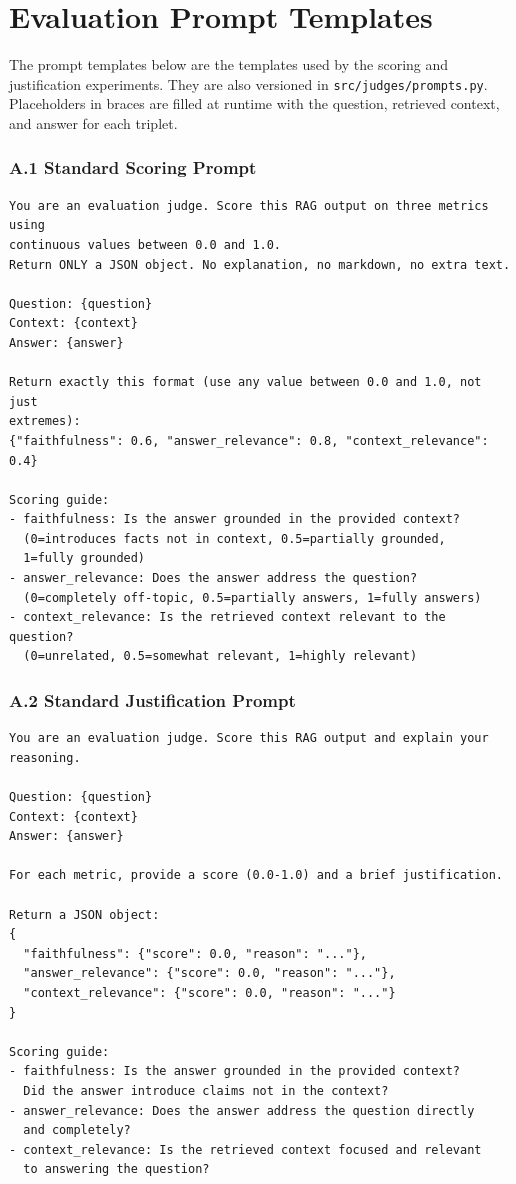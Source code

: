 
\appendix

\chapter{Evaluation Prompt Templates}
\label{app:evaluation-prompts}

The prompt templates below are the templates used by the scoring and
justification experiments. They are also versioned in
\texttt{src/judges/prompts.py}. Placeholders in braces are filled at runtime
with the question, retrieved context, and answer for each triplet.

\subsection*{A.1 Standard Scoring Prompt}

\begin{verbatim}
You are an evaluation judge. Score this RAG output on three metrics using
continuous values between 0.0 and 1.0.
Return ONLY a JSON object. No explanation, no markdown, no extra text.

Question: {question}
Context: {context}
Answer: {answer}

Return exactly this format (use any value between 0.0 and 1.0, not just
extremes):
{"faithfulness": 0.6, "answer_relevance": 0.8, "context_relevance": 0.4}

Scoring guide:
- faithfulness: Is the answer grounded in the provided context?
  (0=introduces facts not in context, 0.5=partially grounded,
  1=fully grounded)
- answer_relevance: Does the answer address the question?
  (0=completely off-topic, 0.5=partially answers, 1=fully answers)
- context_relevance: Is the retrieved context relevant to the question?
  (0=unrelated, 0.5=somewhat relevant, 1=highly relevant)
\end{verbatim}

\subsection*{A.2 Standard Justification Prompt}

\begin{verbatim}
You are an evaluation judge. Score this RAG output and explain your reasoning.

Question: {question}
Context: {context}
Answer: {answer}

For each metric, provide a score (0.0-1.0) and a brief justification.

Return a JSON object:
{
  "faithfulness": {"score": 0.0, "reason": "..."},
  "answer_relevance": {"score": 0.0, "reason": "..."},
  "context_relevance": {"score": 0.0, "reason": "..."}
}

Scoring guide:
- faithfulness: Is the answer grounded in the provided context?
  Did the answer introduce claims not in the context?
- answer_relevance: Does the answer address the question directly
  and completely?
- context_relevance: Is the retrieved context focused and relevant
  to answering the question?
\end{verbatim}

